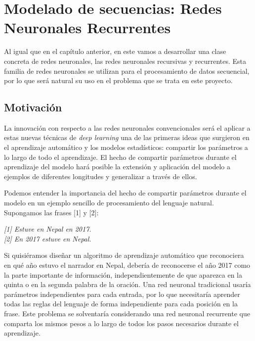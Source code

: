 \chapter{Modelado de secuencias: Redes Neuronales Recurrentes}
Al igual que en el capítulo anterior, en este vamos a desarrollar una clase concreta de redes neuronales, las redes neuronales recursivas y recurrentes. Esta familia de redes neuronales se utilizan para el procesamiento de datos secuencial, por lo que será natural su uso en el problema que se trata en este proyecto. 

\section{Motivación}

La innovación con respecto a las redes neuronales convencionales será el aplicar a estas nuevas técnicas de \textit{deep learning} una de las primeras ideas que surgieron en el aprendizaje automático y los modelos estadísticos: compartir los parámetros a lo largo de todo el aprendizaje. El hecho de compartir parámetros durante el aprendizaje del modelo hará posible la extensión y aplicación del modelo a ejemplos de diferentes longitudes y generalizar a través de ellos. 

Podemos entender la importancia del hecho de compartir parámetros durante el modelo en un ejemplo sencillo de procesamiento del lenguaje natural. Supongamos las frases [1] y [2]:

	\begin{center}
	\begin{minipage}{0.4\linewidth}
		\vspace{5pt}%
		{\small
			\textit{[1] Estuve en  Nepal en 2017.}
			\\\textit{[2] En 2017 estuve en Nepal.}
		}
		\vspace{5pt}%
	\end{minipage}
\end{center}

Si quisiéramos diseñar un algoritmo de aprendizaje automático que reconociera en qué año estuvo el narrador en Nepal, debería de reconocerse el año 2017 como la parte importante de información, independientemente de que aparezca en la quinta o en la segunda palabra de la oración. Una red neuronal tradicional usaría parámetros independientes para cada entrada, por lo que necesitaría aprender todas las reglas del lenguaje de forma independiente para cada posición en la frase. Este problema se solventaría considerando una red neuronal recurrente que comparta los mismos pesos a lo largo de todos los pasos necesarios durante el aprendizaje.

